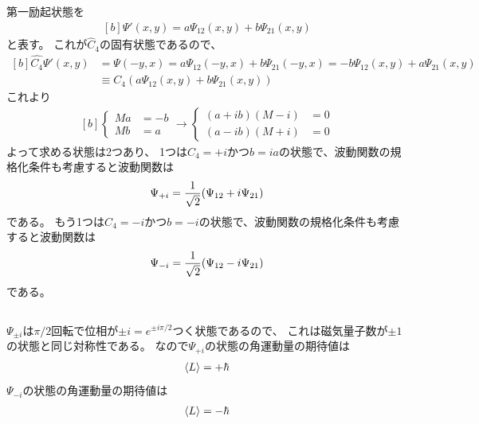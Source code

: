 \documentclass[../ap_2023.tex]{subfiles}
\begin{document}
\subsection{}
第一励起状態を
\begin{equation}\begin{aligned}[b]
    \Psi'(x,y)=a\Psi_{12}(x,y)+b\Psi_{21}(x,y)
\end{aligned}\end{equation}
と表す。
これが\(\hat{C}_4\)の固有状態であるので、
\begin{equation}\begin{aligned}[b]
    \hat{C_4}\Psi'(x,y)&=\Psi(-y,x)
        = a\Psi_{12}(-y,x)+b\Psi_{21}(-y,x)
        = -b\Psi_{12}(x,y)+a\Psi_{21}(x,y)\\
    &\equiv C_4(a\Psi_{12}(x,y)+b\Psi_{21}(x,y))
\end{aligned}\end{equation}
これより
\begin{equation}\begin{aligned}[b]
    \begin{cases}
        Ma &= -b\\
        Mb &= a
    \end{cases}
    \rightarrow
    \begin{cases}
        (a+ib)(M-i)&=0\\
        (a-ib)(M+i)&=0
    \end{cases}
\end{aligned}\end{equation}
よって求める状態は2つあり、
1つは\(C_4=+i\)かつ\(b=ia\)の状態で、波動関数の規格化条件も考慮すると波動関数は
\begin{equation}\begin{aligned}[b]
    \Psi_{+i} = \frac{1}{\sqrt{2}}\qty(\Psi_{12}+i\Psi_{21})
\end{aligned}\end{equation}
である。
もう1つは\(C_4=-i\)かつ\(b=-i\)の状態で、波動関数の規格化条件も考慮すると波動関数は
\begin{equation}\begin{aligned}[b]
    \Psi_{-i} = \frac{1}{\sqrt{2}}\qty(\Psi_{12}-i\Psi_{21})
\end{aligned}\end{equation}
である。

\subsection{}
\(\Psi_{\pm i}\)は\(\pi/2\)回転で位相が\(\pm i= e^{\pm i\pi/2}\)つく状態であるので、
これは磁気量子数が\(\pm 1\)の状態と同じ対称性である。
なので\(\Psi_{+i}\)の状態の角運動量の期待値は
\begin{equation}\begin{aligned}[b]
    \ev{L} = +\hbar
\end{aligned}\end{equation}
\(\Psi_{-i}\)の状態の角運動量の期待値は
\begin{equation}\begin{aligned}[b]
    \ev{L} = -\hbar
\end{aligned}\end{equation}
\end{document}
